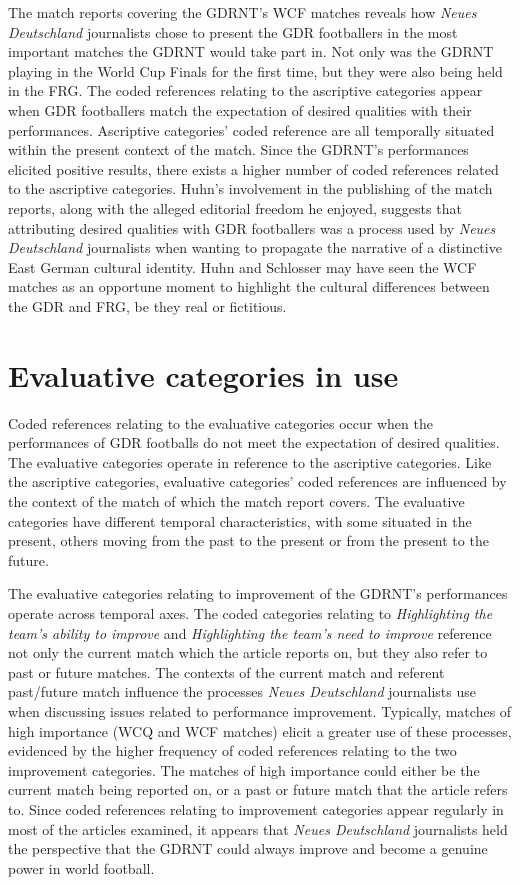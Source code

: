 The match reports covering the GDRNT’s WCF matches reveals how \textit{Neues Deutschland} journalists chose to present the GDR footballers in the most important matches the GDRNT would take part in. Not only was the GDRNT playing in the World Cup Finals for the first time, but they were also being held in the FRG. The coded references relating to the ascriptive categories appear when GDR footballers match the expectation of desired qualities with their performances. Ascriptive categories’ coded reference are all temporally situated within the present context of the match. Since the GDRNT’s performances elicited positive results, there exists a higher number of coded references related to the ascriptive categories. Huhn’s involvement in the publishing of the match reports, along with the alleged editorial freedom he enjoyed, suggests that attributing desired qualities with GDR footballers was a process used by \textit{Neues Deutschland} journalists when wanting to propagate the narrative of a distinctive East German cultural identity. Huhn and Schlosser may have seen the WCF matches as an opportune moment to highlight the cultural differences between the GDR and FRG, be they real or fictitious.

\section*{Evaluative categories in use}

Coded references relating to the evaluative categories occur when the performances of GDR footballs do not meet the expectation of desired qualities. The evaluative categories operate in reference to the ascriptive categories. Like the ascriptive categories, evaluative categories’ coded references are influenced by the context of the match of which the match report covers. The evaluative categories have different temporal characteristics, with some situated in the present, others moving from the past to the present or from the present to the future.

The evaluative categories relating to improvement of the GDRNT’s performances operate across temporal axes. The coded categories relating to \textit{Highlighting the team’s ability to improve} and \textit{Highlighting the team’s need to improve} reference not only the current match which the article reports on, but they also refer to past or future matches. The contexts of the current match and referent past/future match influence the processes \textit{Neues Deutschland} journalists use when discussing issues related to performance improvement. Typically, matches of high importance (WCQ and WCF matches) elicit a greater use of these processes, evidenced by the higher frequency of coded references relating to the two improvement categories. The matches of high importance could either be the current match being reported on, or a past or future match that the article refers to. Since coded references relating to improvement categories appear regularly in most of the articles examined, it appears that \textit{Neues Deutschland} journalists held the perspective that the GDRNT could always improve and become a genuine power in world football.

